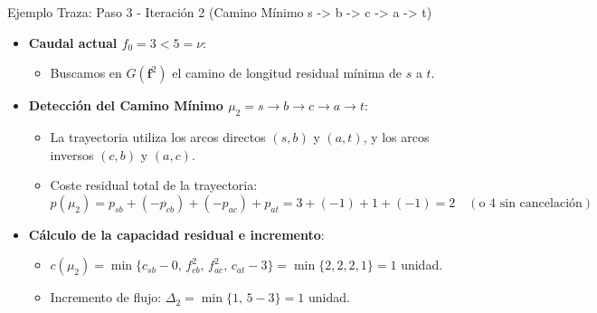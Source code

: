 \documentclass[
  ignorenonframetext,
]{beamer}
\providecommand{\tightlist}{%
  \setlength{\itemsep}{0pt}\setlength{\parskip}{0pt}}
\begin{document}
\begin{frame}{Ejemplo Traza: Paso 3 - Iteración 2 (Camino Mínimo s
-\textgreater{} b -\textgreater{} c -\textgreater{} a -\textgreater{}
t)}
\label{ejemplo-traza-paso-3---iteraciuxf3n-2-camino-muxednimo-s---b---c---a---t}
\begin{itemize}
\tightlist
\item
  \textbf{Caudal actual \(f_0 = 3 < 5 = \nu\)}:

  \begin{itemize}
  \tightlist
  \item
    Buscamos en \(G(\mathbf{f}^2)\) el camino de longitud residual
    mínima de \(s\) a \(t\).
  \end{itemize}
\item
  \textbf{Detección del Camino Mínimo
  \(\mu_2 = s \to b \to c \to a \to t\)}:

  \begin{itemize}
  \tightlist
  \item
    La trayectoria utiliza los arcos directos \((s,b)\) y \((a,t)\), y
    los arcos inversos \((c,b)\) y \((a,c)\).
  \item
    Coste residual total de la trayectoria:
    \[p(\mu_2) = p_{sb} + (-p_{cb}) + (-p_{ac}) + p_{at} = 3 + (-1) + 1 + (-1) = 2 \quad (\text{o } 4 \text{ sin cancelación})\]
  \end{itemize}
\item
  \textbf{Cálculo de la capacidad residual e incremento}:

  \begin{itemize}
  \tightlist
  \item
    \(c(\mu_2) = \min \{ c_{sb}-0, \, f_{cb}^2, \, f_{ac}^2, \, c_{at}-3 \} = \min \{2, 2, 2, 1\} = 1\)
    unidad.
  \item
    Incremento de flujo: \(\Delta_2 = \min \{1, \, 5 - 3\} = 1\) unidad.
  \end{itemize}
\end{itemize}
\end{frame}
\end{document}
